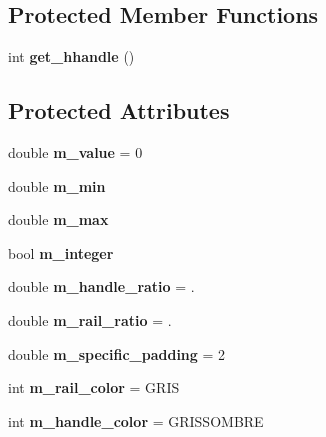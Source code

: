 \subsection*{Protected Member Functions}
\begin{DoxyCompactItemize}
\item 
\mbox{\label{classgrman_1_1_widget_v_slider_a4f1b70003e9cb3e1355374c7b2dd47b2}} 
int {\bfseries get\+\_\+hhandle} ()
\end{DoxyCompactItemize}
\subsection*{Protected Attributes}
\begin{DoxyCompactItemize}
\item 
\mbox{\label{classgrman_1_1_widget_v_slider_a5515dac66009ce6b5ab43bb9b7949d69}} 
double {\bfseries m\+\_\+value} = 0
\item 
\mbox{\label{classgrman_1_1_widget_v_slider_a61be86890020cf9cd9a52f5bd80fed8a}} 
double {\bfseries m\+\_\+min}
\item 
\mbox{\label{classgrman_1_1_widget_v_slider_afeeb86838c0237495bd581994b975ad3}} 
double {\bfseries m\+\_\+max}
\item 
\mbox{\label{classgrman_1_1_widget_v_slider_ad3517557b287e27878b54fa730fc83e4}} 
bool {\bfseries m\+\_\+integer}
\item 
\mbox{\label{classgrman_1_1_widget_v_slider_a8b13d018065b9e59ce53619dcf5e9882}} 
double {\bfseries m\+\_\+handle\+\_\+ratio} = .
\item 
\mbox{\label{classgrman_1_1_widget_v_slider_af4b78db8b06c7793d3ab9ce24acb47d0}} 
double {\bfseries m\+\_\+rail\+\_\+ratio} = .
\item 
\mbox{\label{classgrman_1_1_widget_v_slider_abf4bcbc737d34bc4ef70be86c32803bb}} 
double {\bfseries m\+\_\+specific\+\_\+padding} = 2
\item 
\mbox{\label{classgrman_1_1_widget_v_slider_a87a842c3b47b605d50eed6809e11893b}} 
int {\bfseries m\+\_\+rail\+\_\+color} = G\+R\+IS
\item 
\mbox{\label{classgrman_1_1_widget_v_slider_a897626a845e891c5c52069359848634c}} 
int {\bfseries m\+\_\+handle\+\_\+color} = G\+R\+I\+S\+S\+O\+M\+B\+RE
\end{DoxyCompactItemize}


